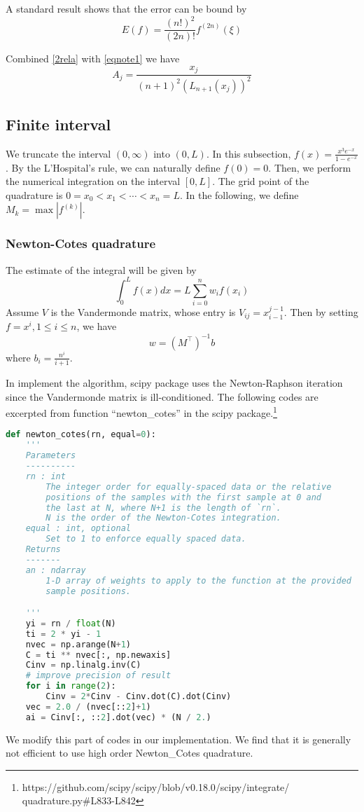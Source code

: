 \documentclass[conference,onecolumn,12pt]{IEEEtran}
\theoremstyle{definition}
\begin{document}
A standard result shows that the error can be bound by
\begin{equation}
    \label{gl_err}
    E(f) = \frac{(n!)^2}{(2n)!}f^{(2n)}(\xi)
\end{equation}


Combined \ref{2rela} with \ref{eqnote1} we have 
\begin{equation}
    A_j = \frac{x_j}{(n+1)^2(L_{n+1}(x_j))^2}
\end{equation}
\subsection{Finite interval}
We truncate the interval $(0,\infty)$ into $(0,L)$. In this subsection,  $f(x)=\frac{x^3 e^{-x}}{1-e^{-x}}$. By the L'Hospital's rule, we can naturally define $f(0)=0$. Then, we perform the numerical integration on the interval $[0,L]$. The grid point of the quadrature is $0=x_0<x_1<\cdots< x_n=L$. In the following, we define $M_k = \max |f^{(k)}|$.

\subsubsection{Newton-Cotes quadrature}
The estimate of the integral will be given by
\begin{equation}
    \int_0^Lf(x)dx={L}\sum_{i=0}^n w_i f(x_i)
\end{equation}
Assume $V$ is the Vandermonde matrix, whose entry is $V_{ij}=x_{i-1}^{j-1}$. Then by setting $f=x^i,1\leq i\leq n$, we have
\begin{equation}
    w = (M^\top)^{-1}b
\end{equation}
where $b_i=\frac{n^{i}}{i+1}$.

In implement the algorithm, scipy package uses the Newton-Raphson iteration since the Vandermonde matrix is ill-conditioned. The following codes are excerpted from function ``newton\_cotes'' in the scipy package.\footnote{https://github.com/scipy/scipy/blob/v0.18.0/scipy/integrate/\\quadrature.py\#L833-L842}
\begin{lstlisting}[language=python]
def newton_cotes(rn, equal=0):
    '''
    Parameters
    ----------
    rn : int
        The integer order for equally-spaced data or the relative 
        positions of the samples with the first sample at 0 and 
        the last at N, where N+1 is the length of `rn`.  
        N is the order of the Newton-Cotes integration.
    equal : int, optional
        Set to 1 to enforce equally spaced data.
    Returns
    -------
    an : ndarray
        1-D array of weights to apply to the function at the provided 
        sample positions.

    '''
    yi = rn / float(N)
    ti = 2 * yi - 1
    nvec = np.arange(N+1)
    C = ti ** nvec[:, np.newaxis]
    Cinv = np.linalg.inv(C)
    # improve precision of result
    for i in range(2):
        Cinv = 2*Cinv - Cinv.dot(C).dot(Cinv)
    vec = 2.0 / (nvec[::2]+1)
    ai = Cinv[:, ::2].dot(vec) * (N / 2.)
\end{lstlisting}
We modify this part of codes in our implementation. We find that it is generally not efficient to use high order Newton\_Cotes quadrature. 
\end{document}
